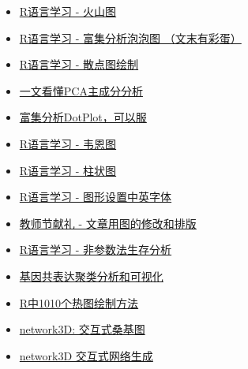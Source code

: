 \documentclass[]{article}
\numberwithin{figure}{section}
\numberwithin{table}{section}
\theoremstyle{definition}
\theoremstyle{definition}
\theoremstyle{definition}
\theoremstyle{remark}
\begin{document}
\begin{itemize}
{  - 箱线图一步法}
\item
  \href{http://mp.weixin.qq.com/s?__biz=MzI5MTcwNjA4NQ==\&mid=2247483996\&idx=1\&sn=9a29d52e78e9acffeb0a78077a14f9f2\&chksm=ec0dc7d6db7a4ec0163259e81e4ded54875a5dd8adaafbc6975a86c71223d863627ba37801e5\#rd}{R语言学习
  - 火山图}
\item
  \href{http://mp.weixin.qq.com/s?__biz=MzI5MTcwNjA4NQ==\&mid=2247483978\&idx=1\&sn=e0c158c0e92375553036cc37f4987e40\&chksm=ec0dc7c0db7a4ed6ac593493b7d8b52f11f2feb92d24fa00d19527fbb6f95b24f7e313ef9440\#rd"}{R语言学习
  - 富集分析泡泡图 （文末有彩蛋）}
\item
  \href{http://mp.weixin.qq.com/s?__biz=MzI5MTcwNjA4NQ==\&mid=2247484056\&idx=1\&sn=f9b2b4f7495b432e9294b7cbf42eaf33\&chksm=ec0dc712db7a4e04769d322558364b4b401b0a8153097c7252e83170e9201a31c2a7abbaf101\#rd}{R语言学习
  - 散点图绘制}
\item
  \href{http://mp.weixin.qq.com/s?__biz=MzI5MTcwNjA4NQ==\&mid=2247484036\&idx=1\&sn=22ee356d0c9680d56dada1b777985ed2\&chksm=ec0dc70edb7a4e182a21475e9ddcde35b907c291549cc8c2e767be260af445ff5455aa358b04\#rd}{一文看懂PCA主成分分析}
\item
  \href{http://mp.weixin.qq.com/s?__biz=MzI5MTcwNjA4NQ==\&mid=2247484063\&idx=1\&sn=f4e93d428e4910b4abbee9c0430cd170\&chksm=ec0dc715db7a4e0318b388ba2ab3d51677741421c42ada474a0ac6046a0699283014eae84b6f\#rd}{富集分析DotPlot，可以服}
\item
  \href{http://mp.weixin.qq.com/s?__biz=MzI5MTcwNjA4NQ==\&mid=2247484076\&idx=1\&sn=fa5af19a2a4db4b0c5c7f145bf93ca57\&chksm=ec0dc726db7a4e30fe7a0492ed9ea8eb5fa1c34641b1442a2da003efde0546b30c48fde3f118\#rd}{R语言学习
  - 韦恩图}
\item
  \href{http://mp.weixin.qq.com/s?__biz=MzI5MTcwNjA4NQ==\&mid=2247484134\&idx=1\&sn=ffb41298eae74834af2f5dad05d37921\&chksm=ec0dc76cdb7a4e7a852ac0670532c12c690399f140a2335f640eaf01f7da26bc5480941686a9\#rd}{R语言学习
  - 柱状图}
\item
  \href{http://mp.weixin.qq.com/s/NAwyvtTS7t5rRU7KKBwHTA}{R语言学习 -
  图形设置中英字体}
\item
  \href{https://mp.weixin.qq.com/s/IJNyhinakY0lSXgCN7b9ug}{教师节献礼 -
  文章用图的修改和排版}
\item
  \href{http://mp.weixin.qq.com/s/_Dy9Yn8fc8I0rASGxH5x9A}{R语言学习 -
  非参数法生存分析}
\item
  \href{http://mp.weixin.qq.com/s/ST2SAmfKOptpJOHS8podmQ}{基因共表达聚类分析和可视化}
\item
  \href{http://mp.weixin.qq.com/s/N7oLvJ1oPIImgybJVVSxXg}{R中1010个热图绘制方法}
\item
  \href{http://mp.weixin.qq.com/s/3okqP0viU3EVML9p1bkQlw}{network3D:
  交互式桑基图}
\item
  \href{https://mp.weixin.qq.com/s/rK5SolI0xGisvBCIcb448A}{network3D
  交互式网络生成}
\end{itemize}
\end{document}
